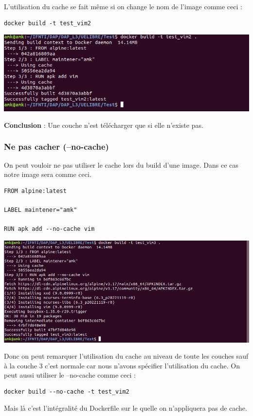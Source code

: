 \documentclass[12pt,a4paper]{article}
\begin{document}
L'utilisation du cache se fait même si on change le nom de l'image comme ceci :
\begin{verbatim}
docker build -t test_vim2
\end{verbatim}
\begin{center}
\includegraphics[scale=0.5]{img/test_vim3.png}
\end{center}
\textbf{Conclusion } : Une couche n'est télécharger que si elle n'existe pas.
\subsubsection{Ne pas cacher (--no-cache)}
On peut vouloir ne pas utiliser le cache lors du build d'une image. Dans ce cas notre image
sera comme ceci.
\begin{verbatim}
FROM alpine:latest

LABEL maintener="amk"

RUN apk add --no-cache vim
\end{verbatim}
\begin{center}
\includegraphics[scale=0.5]{img/test_vim_no_cache.png}
\end{center}
Donc on peut remarquer l'utilisation du cache au niveau de toute les couches sauf à la 
couche 3 c'est normale car nous n'avons spécifier l'utilisation du cache.
On peut aussi utiliser le --no-cache comme ceci :
\begin{verbatim}
docker build --no-cache -t test_vim2
\end{verbatim}
Mais là c'est l'intégralité du Dockerfile sur le quelle on n'appliquera pas de cache.
\end{document}
